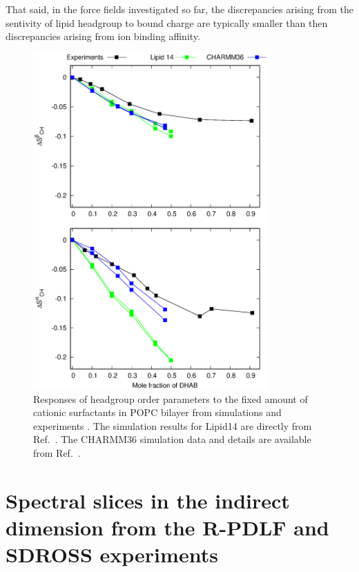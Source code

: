 \documentclass[journal=jpcbfk]{achemso}
\begin{document}
That said, in the force fields investigated so far, the discrepancies arising from the sentivity of lipid headgroup to
bound charge are typically smaller than then discrepancies arising from ion binding affinity.
\begin{figure}[]
  \centering
  \includegraphics[width=9.0cm]{../Figs/HGopsDHMDMAB.eps}
  \caption{\label{CHANGESwithDHMDMAB}
  Responses of headgroup order parameters to the fixed amount of cationic surfactants in
  POPC bilayer from simulations and experiments \cite{scherer89}.
  The simulation results for Lipid14 are directly from Ref.~.
  The CHARMM36 simulation data and details are available from Ref.~.
}
\end{figure}


\pagebreak
\section{Spectral slices in the indirect dimension from the R-PDLF and SDROSS experiments}
\end{document}
